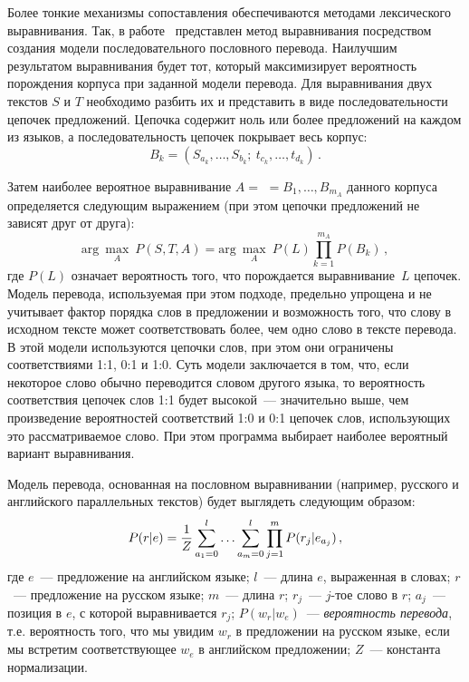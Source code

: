 \begin{multicols}{2}
Более тонкие механизмы сопоставления обеспечиваются методами
лексического выравнивания. Так, в работе~\cite{39koz} представлен
метод выравнивания посредством создания модели последовательного
пословного перевода. Наилучшим результатом выравнивания будет тот,
который максимизирует вероятность порождения корпуса при заданной
модели перевода. Для выравнивания двух текстов $S$ и $T$ необходимо
разбить их и представить в виде последовательности цепочек предложений.
Цепочка содержит ноль или более предложений на каждом из языков, а
последовательность цепочек покрывает весь корпус:
$$
B_k = (S_{a_k},\ldots , S_{b_k};\ t_{c_k},\ldots , t_{d_k})\,.
$$

Затем наиболее вероятное выравнивание $A=$\linebreak
$=B_1,\ldots , B_{m_A}$
данного корпуса определяется следующим выражением (при этом цепочки
предложений не зависят друг от друга):
$$
\mathrm{arg}\ \underset{A}{\max}\ P(S,T,A) = \mathrm{arg}\
\underset{A}{\max}\ P(L)\prod\limits_{k=1}^{m_A} P(B_k)\,,
$$
где $P(L)$ означает вероятность того, что порождается выравнивание~$L$
цепочек. Модель перевода, используемая при этом подходе, предельно
упрощена и не учитывает фактор порядка слов в предложении и возможность
того, что слову в исходном тексте может соответствовать более, чем одно
слово в тексте перевода. В этой модели используются цепочки слов, при этом
они ограничены соответствиями 1:1, 0:1 и 1:0. Суть модели заключается в
том, что, если некоторое слово обычно переводится словом другого языка, то
вероятность соответствия цепочек слов 1:1 будет высокой~--- значительно
выше, чем произведение вероятностей соответствий 1:0 и 0:1 цепочек слов,
использующих это рассматриваемое слово. При этом программа выбирает
наиболее вероятный вариант выравнивания.

Модель перевода, основанная на пословном выравнивании (например,
русского и английского параллельных текстов) будет выглядеть следующим
образом:
$$
P(r\vert e ) = \displaystyle\frac{\displaystyle 1\mathstrut}{\displaystyle Z\mathstrut} \sum\limits_{a_1=0}^l\ldots \sum\limits_{a_m=0}^l
\prod\limits_{j=1}^m P(r_j\vert e_{a_j})\,,
$$
где $e$~--- предложение на английском языке; $l$~--- длина $e$, выраженная в 
словах;  $r$~--- предложение на русском языке; $m$~--- длина $r$; $r_j$~--- 
$j$-тое слово в $r$; $a_j$~--- позиция в $e$, с которой выравнивается $r_j$; 
$P(w_r\vert w_e)$~--- \textit{вероятность перевода}, т.е. вероятность того, что 
мы увидим $w_r$ в предложении на русском языке, если мы встретим 
со\-от\-вет\-ст\-ву\-ющее $w_e$ в английском предложении; $Z$~--- константа 
нормализации.


\end{multicols}
